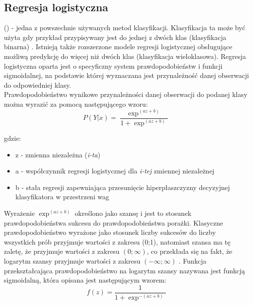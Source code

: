 \newpage

\subsection{Regresja logistyczna}
\noindent
{} () - jedna z powszechnie używanych metod klasyfikacji. Klasyfikacja ta może być użyta gdy przykład przypisywany jest do jednej z dwóch klas (klasyfikacja binarna) \cite{PPlonski}. Istnieją także rozszerzone modele regresji logistycznej obsługujące możliwą predykcję do więcej niż dwóch klas (klasyfikacja wieloklasowa). Regresja logistyczna oparta jest o specyficzny system prawdopodobieństw i funkcji sigmoidalnej, na podstawie której wyznaczana jest przynależność danej obserwacji do odpowiedniej klasy.\\

Prawdopodobieństwo wynikowe przynależności danej obserwacji do podanej klasy można wyrazić za pomocą następującego wzoru:
\begin{equation}
    P(Y|x) = \frac{\exp^{(az + b)}}{1 + \exp^{(az + b)}}
\end{equation}

gdzie:
\begin{itemize}
    \item z - zmienna niezależna (\textit{i-ta})
    \item a - współczynnik regresji logistycznej dla \textit{i-tej} zmiennej niezależnej
    \item b - stała regresji zapewniająca przesunięcie hiperpłaszczyzny decyzyjnej klasyfikatora w przestrzeni wag
\end{itemize}


Wyrażenie $\exp^{(az + b)}$ określono jako szansę i jest to stosunek prawdopodobieństwa sukcesu do prawdopodobieństwa porażki. Klasyczne prawdopodobieństwo wyrażone jako stosunek liczby sukcesów do liczby wszystkich prób przyjmuje wartości z zakresu (0;1), natomiast szansa ma tę zaletę, że przyjmuje wartości z zakresu $(0;\infty)$, co przekłada się na fakt, że logarytm szansy przyjmuje wartości z zakresu $(-\infty;\infty)$ \cite{Hosmer}. Funkcja przekształcająca prawdopodobieństwo na logarytm szansy nazywana jest funkcją sigmoidalną, która opisana jest następującym wzorem:\\

\begin{equation}
    f(z) = \frac{1}{1 + \exp^{-(az + b)}}
\end{equation}


